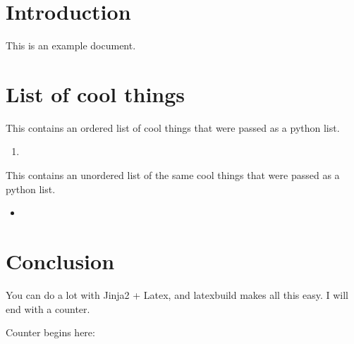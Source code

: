 \documentclass[12pt]{article}
\title{\BLOCK{block title}\BLOCK{endblock}}
\author{\vspace{-5ex}}
\date{\vspace{-5ex}}
\newcounter{session}
\begin{document}
\maketitle

\section*{Introduction}

This is an example document. 

\section*{List of cool things}

This contains an ordered list of cool things that were passed as a python list.

\begin{enumerate}
  \item {}
\end{enumerate}

This contains an unordered list of the same cool things that were passed as a python list.

\begin{itemize}
  \item {}
\end{itemize}

\section*{Conclusion}

You can do a lot with Jinja2 + Latex, and latexbuild makes all this easy. I will end with a counter.

Counter begins here: \\
\setcounter{session}{0}
 \\
 \\
 \\
 \\
 \\
 \\
\end{document}
